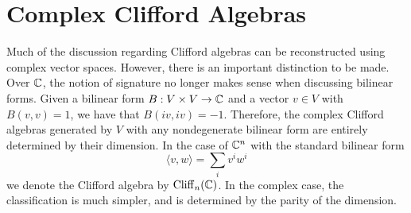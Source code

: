 \section{Complex Clifford Algebras}
%
Much of the discussion regarding Clifford algebras can be reconstructed
using complex vector spaces. However, there is an important distinction
to be made. Over $\mathbb{C}$, the notion of signature no longer makes sense
when discussing bilinear forms. Given a bilinear form $B : V \times V \to \mathbb{C}$
and a vector $v \in V$ with $B(v,v) = 1$, we have that $B(iv,iv) = -1$. Therefore,
the complex Clifford algebras generated by $V$ with any nondegenerate bilinear
form are entirely determined by their dimension. In the case of $\mathbb{C}^n$ with
the standard bilinear form
\[
\langle v,w \rangle = \sum_i v^iw^i
\]
we denote the Clifford algebra by $\operatorname{Cliff}_n(\mathbb{C})$. In the complex case, the
classification is much simpler, and is determined by the parity of the dimension. \\

